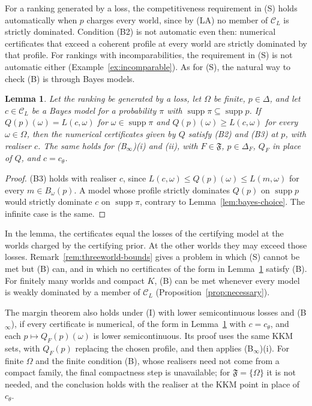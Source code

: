 \documentclass[11pt]{article}
\newtheorem{lemma}[theorem]{Lemma}
\theoremstyle{definition}
\theoremstyle{remark}
\newcommand{\C}{\mathcal C}
\newcommand{\F}{\mathfrak F}
\newcommand{\supp}{\operatorname{supp}}
\begin{document}
For a ranking generated by a loss, the competitiveness requirement in (S) holds automatically when $p$ charges every world, since by (LA) no member of $\C_L$ is strictly dominated. Condition (B2) is not automatic even then: numerical certificates that exceed a coherent profile at every world are strictly dominated by that profile. For rankings with incomparabilities, the requirement in (S) is not automatic either (Example~\ref{ex:incomparable}). As for (S), the natural way to check (B) is through Bayes models.

\begin{lemma}\label{lem:bayesbounds}
Let the ranking be generated by a loss, let $\Omega$ be finite, $p\in\Delta$, and let $c\in\C_L$ be a Bayes model for a probability $\pi$ with $\supp\pi\subseteq\supp p$. If $Q(p)(\omega)=L(c,\omega)$ for $\omega\in\supp\pi$ and $Q(p)(\omega)\ge L(c,\omega)$ for every $\omega\in\Omega$, then the numerical certificates given by $Q$ satisfy (B2) and (B3) at $p$, with realiser $c$. The same holds for (B$_\infty$)(i) and (ii), with $F\in\F$, $p\in\Delta_F$, $Q_F$ in place of $Q$, and $c=c_\theta$.
\end{lemma}
\begin{proof}
(B3) holds with realiser $c$, since $L(c,\omega)\le Q(p)(\omega)\le L(m,\omega)$ for every $m\in B_\omega(p)$. A model whose profile strictly dominates $Q(p)$ on $\supp p$ would strictly dominate $c$ on $\supp\pi$, contrary to Lemma~\ref{lem:bayes-choice}. The infinite case is the same.
\end{proof}
In the lemma, the certificates equal the losses of the certifying model at the worlds charged by the certifying prior. At the other worlds they may exceed those losses. Remark~\ref{rem:threeworld-bounds} gives a problem in which (S) cannot be met but (B) can, and in which no certificates of the form in Lemma~\ref{lem:bayesbounds} satisfy (B). For finitely many worlds and compact $K$, (B) can be met whenever every model is weakly dominated by a member of $\C_L$ (Proposition~\ref{prop:necessary}).

The margin theorem also holds under (I) with lower semicontinuous losses and (B$_\infty$), if every certificate is numerical, of the form in Lemma~\ref{lem:bayesbounds} with $c=c_\theta$, and each $p\mapsto Q_F(p)(\omega)$ is lower semicontinuous. Its proof uses the same KKM sets, with $Q_F(p)$ replacing the chosen profile, and then applies (B$_\infty$)(i). For finite $\Omega$ and the finite condition (B), whose realisers need not come from a compact family, the final compactness step is unavailable; for $\F=\{\Omega\}$ it is not needed, and the conclusion holds with the realiser at the KKM point in place of $c_\theta$.
\end{document}
